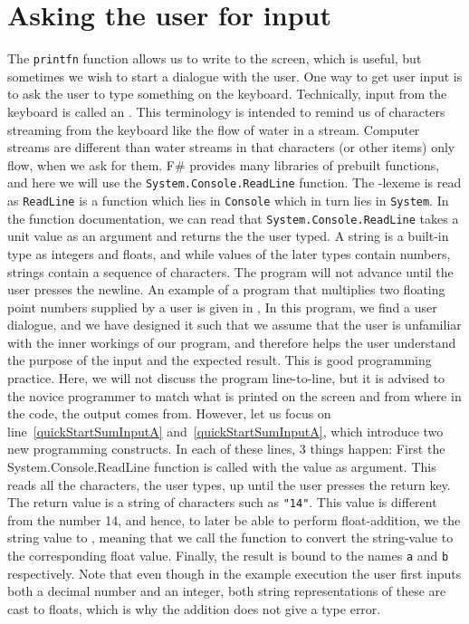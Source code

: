 \documentclass[fsharpNotes.tex]{subfiles}
\begin{document}
\section{Asking the user for input}
The \lstinline{printfn} function allows us to write to the screen, which is useful, but sometimes we wish to start a dialogue with the user. One way to get user input is to ask the user to type something on the keyboard. Technically, input from the keyboard is called an  . This terminology is intended to remind us of characters streaming from the keyboard like the flow of water in a stream. Computer streams are different than water streams in that characters (or other items) only flow, when we ask for them. F\# provides many libraries of prebuilt functions, and here we will use the \lstinline{System.Console.ReadLine} function. The -lexeme is read as \lstinline{ReadLine} is a function which lies in \lstinline{Console} which in turn lies in \lstinline{System}. In the function documentation, we can read that \lstinline{System.Console.ReadLine} takes a unit value as an argument and returns the  the user typed. A string is a built-in type as integers and floats, and while values of the later types contain numbers, strings contain a sequence of characters. The program will not advance until the user presses the newline. An example of a program that multiplies two floating point numbers supplied by a user is given in ,
% 
%
In this program, we find a user dialogue, and we have designed it such that we assume that the user is unfamiliar with the inner workings of our program, and therefore helps the user understand the purpose of the input and the expected result. This is good programming practice. Here, we will not discuss the program line-to-line, but it is advised to the novice programmer to match what is printed on the screen and from where in the code, the output comes from. However, let us focus on line~\ref{quickStartSumInputA} and~\ref{quickStartSumInputA}, which introduce two new programming constructs. In each of these lines, 3 things happen: First the System.Console.ReadLine function is called with the \lexeme{()} value as argument. This reads all the characters, the user types, up until the user presses the return key. The return value is a string of characters such as \lstinline{"14"}. This value is different from the number 14, and hence, to later be able to perform float-addition, we  the string value to , meaning that we call the function  to convert the string-value to the corresponding float value. Finally, the result is bound to the names \lstinline{a} and \lstinline{b} respectively. Note that even though in the example execution the user first inputs both a decimal number and an integer, both string representations of these are cast to floats, which is why the addition does not give a type error.
\end{document}
